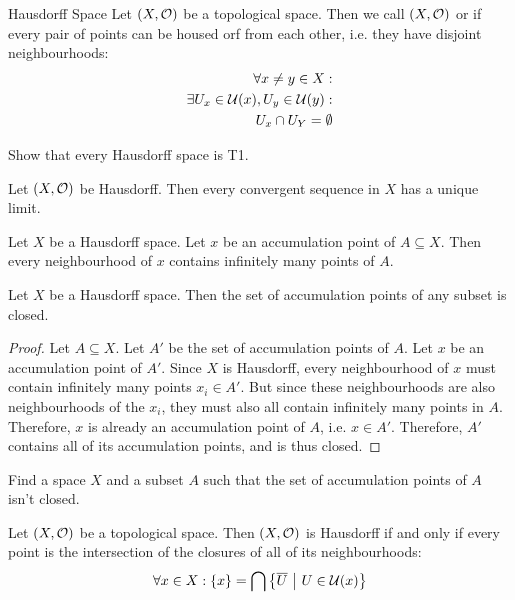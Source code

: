 \begin{importantdefinition}{Hausdorff Space}{}
	Let $(X, \mathcal{O})$ be a topological space. Then we call $(X,\mathcal{O})$  or  if every pair of points can be housed orf from each other, i.e. they have disjoint neighbourhoods:
	\begin{align*}
		\forall x \neq y \in X:\\
		\exists U_x \in \mathcal{U}(x), U_y \in \mathcal{U}(y):\\
		U_x \cap U_Y = \emptyset
	\end{align*}
\end{importantdefinition}
\begin{exercise}
	Show that every Hausdorff space is T1.
\end{exercise}
\begin{exercise}
	Let $(X, \mathcal{O})$ be Hausdorff. Then every convergent sequence in $X$ has a unique limit.
\end{exercise}
\begin{exercise}
	Let $X$ be a Hausdorff space. Let $x$ be an accumulation point of $A \subseteq X$. Then every neighbourhood of $x$ contains infinitely many points of $A$.
\end{exercise}
\begin{lemma}
	Let $X$ be a Hausdorff space. Then the set of accumulation points of any subset is closed.
\end{lemma}
\begin{proof}
	Let $A \subseteq X$. Let $A'$ be the set of accumulation points of $A$. Let $x$ be an accumulation point of $A'$. Since $X$ is Hausdorff, every neighbourhood of $x$ must contain infinitely many points $x_i \in A'$. But since these neighbourhoods are also neighbourhoods of the $x_i$, they must also all contain infinitely many points in $A$. 
	\newpar
	Therefore, $x$ is already an accumulation point of $A$, i.e. $x \in A'$. Therefore, $A'$ contains all of its accumulation points, and is thus closed.
\end{proof}
\begin{exercise}
	Find a space $X$ and a subset $A$ such that the set of accumulation points of $A$ isn't closed.
\end{exercise}
\begin{theorem}
	Let $(X, \mathcal{O})$ be a topological space. Then $(X, \mathcal{O})$ is Hausdorff if and only if every point is the intersection of the closures of all of its neighbourhoods:
	\begin{align*}
		\forall x \in X : \qty{x} = \bigcap \qty{\overline{{U}} ~\middle|~U \in \mathcal{U}(x)}
	\end{align*}
\end{theorem}
